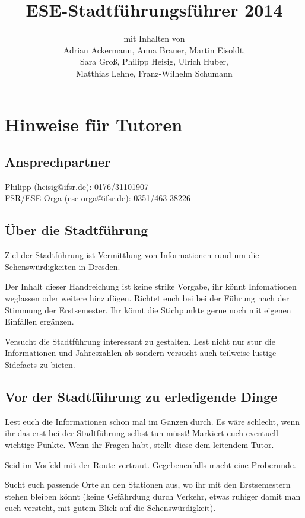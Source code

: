 \documentclass[a4paper,12pt]{report}
\begin{document}
\title{\textbf{ESE-Stadtführungsführer 2014}\\}
\date{}
\author{mit Inhalten von\\Adrian Ackermann, Anna Brauer, Martin Eisoldt,\\Sara Groß, Philipp Heisig, Ulrich Huber,\\ Matthias Lehne, Franz-Wilhelm Schumann}
\maketitle

\chapter{Hinweise für Tutoren}
\section{Ansprechpartner}
Philipp (heisig@ifsr.de): 0176/31101907\\
FSR/ESE-Orga (ese-orga@ifsr.de): 0351/463-38226

\section{Über die Stadtführung}
\begin{itemize*}
\item Ziel der Stadtführung ist Vermittlung von Informationen rund um die Sehenswürdigkeiten in Dresden.
\item Der Inhalt dieser Handreichung ist keine strike Vorgabe, ihr könnt Infomationen weglassen oder weitere hinzufügen.
Richtet euch bei bei der Führung nach der Stimmung der Erstsemester.
Ihr könnt die Stichpunkte gerne noch mit eigenen Einfällen ergänzen.
\item Versucht die Stadtführung interessant zu gestalten. Lest nicht nur stur die Informationen und Jahreszahlen ab sondern versucht auch teilweise lustige Sidefacts zu bieten.
\end{itemize*}

\section{Vor der Stadtführung zu erledigende Dinge}
\begin{itemize*}
\item Lest euch die Informationen schon mal im Ganzen durch.
Es wäre schlecht, wenn ihr das erst bei der Stadtführung selbst tun müsst!
Markiert euch eventuell wichtige Punkte.
Wenn ihr Fragen habt, stellt diese dem leitendem Tutor.
\item Seid im Vorfeld mit der Route vertraut. Gegebenenfalls macht eine Proberunde.
\item Sucht euch passende Orte an den Stationen aus, wo ihr mit den Erstsemestern stehen bleiben könnt (keine Gefährdung durch Verkehr, etwas ruhiger damit man euch versteht, mit gutem Blick auf die Sehenswürdigkeit).
\end{itemize*}
\end{document}
